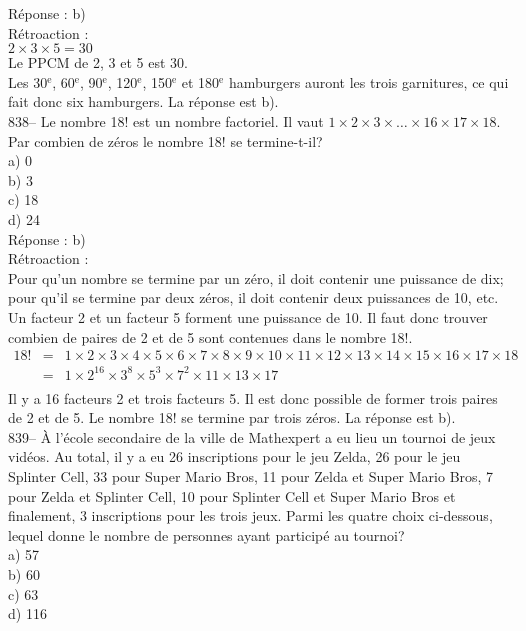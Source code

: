 ﻿\documentclass[letterpaper, 12pt]{article}
\begin{document}
R\'eponse : b)\\

R\'etroaction : \\
$2\times3\times5=30$\\
Le PPCM de 2, 3 et 5 est 30.  \\
Les 30$^{\textrm{e}}$, 60$^{\textrm{e}}$, 90$^{\textrm{e}}$,
120$^{\textrm{e}}$, 150$^{\textrm{e}}$ et 180$^{\textrm{e}}$
hamburgers auront  les trois garnitures, ce qui fait donc six hamburgers.
La r\'eponse est b).\\

838-- Le nombre 18! est un nombre factoriel.  Il vaut
$1\times2\times3\times\ldots\times16\times17\times18$.  Par combien
de
z\'eros le nombre 18! se termine-t-il?\\
a) 0\\
b) 3\\
c) 18\\
d) 24\\

R\'eponse : b)\\

R\'etroaction : \\
Pour qu'un nombre se termine par un z\'ero, il doit contenir une
puissance de dix; pour qu'il se termine par deux z\'eros, il doit
contenir deux puissances de 10, etc.  Un facteur 2 et un facteur 5
forment une puissance de 10.  Il faut donc trouver combien de paires
de 2 et de 5 sont contenues dans le nombre 18!.
\begin{eqnarray*}
18!
&=&1\times2\times3\times4\times5\times6\times7\times8\times9\times10\times11\times12\times13\times14\times15\times16\times17\times18\\[2mm]
&=&1\times2^{16}\times3^{8}\times5^{3}\times7^{2}\times11\times13\times17\\[2mm]
\end{eqnarray*}
Il y a 16 facteurs 2 et trois facteurs 5.  Il est donc possible de former
trois paires de 2 et de 5.  Le nombre 18! se termine par trois z\'eros.  La
r\'eponse est b).\\

839-- \`A l'\'ecole secondaire de la ville de Mathexpert a eu lieu un
tournoi de jeux vid\'eos.  Au total, il y a  eu 26 inscriptions pour le jeu
Zelda, 26 pour le jeu Splinter Cell, 33 pour Super Mario Bros, 11 pour Zelda
et Super Mario Bros, 7 pour Zelda et Splinter Cell,  10 pour Splinter Cell
et Super Mario Bros et finalement, 3 inscriptions pour les trois jeux.
Parmi les quatre choix ci-dessous, lequel donne le nombre de personnes ayant
particip\'e au tournoi?\\
a) 57\\
b) 60\\
c) 63\\
d) 116\\
\end{document}
